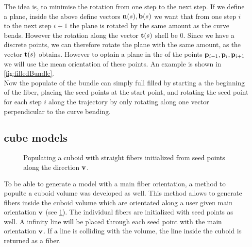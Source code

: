 The idea is, to minimise the rotation from one step to the next step.
If we define a plane, inside the above define vectors $\mathbf{n}(s),\mathbf{b}(s)$ we want that from one step $i$ to the next step $i+1$ the plane is rotated by the same amount as the curve bends.
However the rotation along the vector $\mathbf{t}(s)$ shell be $0$.
Since we have a discrete points, we can therefore rotate the plane with the same amount, as the vector $\mathbf{t}(s)$ obtains.
However to optain a plane in the  of the points $\mathbf{p}_{i-1}, \mathbf{p}_{i}, \mathbf{p}_{i+1}$ we will use the mean orientation of these points.
An example is shown in \cref{fig:filledBundle}.
\\
% 
Now the populate of the bundle can simply full filled by starting a the beginning of the fiber, placing the seed points at the start point, and rotating the seed point for each step $i$ along the trajectory by only rotating along one vector perpendicular to the curve bending.
% 
\subsection{cube models}
% 
\begin{figure}[!t]
    \centering
    \setlength{\tikzwidth}{0.5\textwidth}
	\caption{Populating a cuboid with straight fibers initialized from seed points along the direction $\mathbf{v}$.}
    \label{fig:cubeBuild}%
\end{figure}
% 
To be able to generate a model with a main fiber orientation, a method to populte a cuboid volume was developed as well.
This method allows to generate fibers inside the cuboid volume which are orientated along a user given main orientation $\mathbf{v}$ (see \cref{fig:cubeBuild}). 
The individual fibers are initialized with seed points as well.
A infinity line will be placed through each seed point with the main orientation $\mathbf{v}$.
If a line is colliding with the volume, the line inside the cuboid is returned as a fiber.
% 
